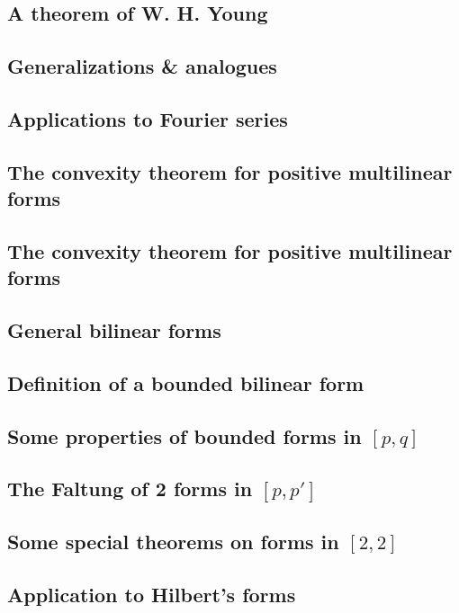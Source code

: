 \documentclass[oneside]{book}
\numberwithin{equation}{section}
\begin{document}
\subsection{A theorem of W. H. Young}

\subsection{Generalizations \& analogues}

\subsection{Applications to Fourier series}

\subsection{The convexity theorem for positive multilinear forms}

\subsection{The convexity theorem for positive multilinear forms}

\subsection{General bilinear forms}

\subsection{Definition of a bounded bilinear form}

\subsection{Some properties of bounded forms in $[p,q]$}

\subsection{The Faltung of 2 forms in $[p,p']$}

\subsection{Some special theorems on forms in $[2,2]$}

\subsection{Application to Hilbert's forms}
\end{document}
